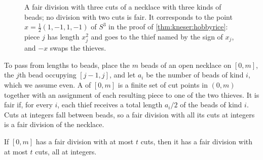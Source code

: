 \begin{refsection}
\begin{figure}[t]
\centering
{}
\caption{A fair division with three cuts of a necklace with three kinds of beads; no division with two cuts is fair. It corresponds to the point $x=\frac12(1,-1,1,-1)$ of $S^3$ in the proof of \cref{thm:kneser:hobbyrice}: piece $j$ has length $x_j^2$ and goes to the thief named by the sign of $x_j$, and $-x$ swaps the thieves.}
\label{fig:kneser:necklace}
\end{figure}

To pass from lengths to beads, place the $m$ beads of an open necklace on $[0,m]$, the $j$th bead occupying $[j-1,j]$, and let $a_i$ be the number of beads of kind $i$, which we assume even. A  of $[0,m]$ is a finite set of cut points in $(0,m)$ together with an assignment of each resulting piece to one of the two thieves. It is fair if, for every $i$, each thief receives a total length $a_i/2$ of the beads of kind $i$. Cuts at integers fall between beads, so a fair division with all its cuts at integers is a fair division of the necklace.

\begin{lemma}[Rounding]\label{lem:kneser:rounding}
If $[0,m]$ has a fair division with at most $t$ cuts, then it has a fair division with at most $t$ cuts, all at integers.
\end{lemma}


\end{refsection}
